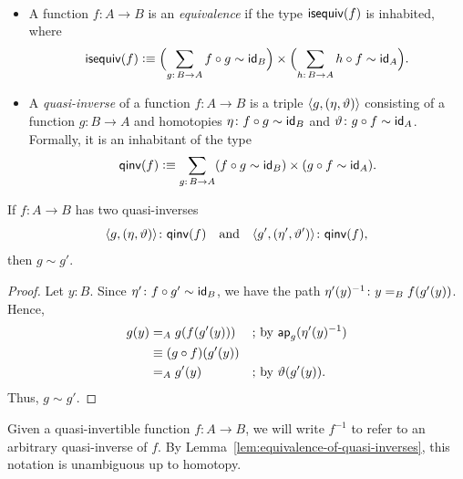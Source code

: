 \begin{defns}\label{defns:isequiv-qinv}${}$
    \begin{itemize}
        \item A function $f\colon A\to B$ is an \textsl{equivalence} if the type $\mathsf{isequiv}(f)$ is inhabited, where
        \[
            \fun{isequiv}(f)\defeq
                \Bigl(\sum_{g\colon B\to A}f\circ g \sim \id_B\Bigr)
                \times
                \Bigl(\sum_{h\colon B\to A}h\circ f\sim\id_A\Bigr).
        \]
    
        \item A \textsl{quasi-inverse} of a function $f \colon A \to B$ is a triple $\langle g,(\eta,\vartheta)\rangle$ consisting of a function $g\colon B\to A$ and homotopies $\eta\colon f\circ g\sim \id_B$ and $\vartheta\colon g\circ f\sim \id_A$. Formally, it is an inhabitant of the type
        \[
            \fun{qinv}(f)\defeq\sum_{g\colon B\to A}
                (f\circ g\sim\id_B)\times(g\circ f\sim\id_A).
        \]
    \end{itemize}
\end{defns}

\begin{lem}\label{lem:equivalence-of-quasi-inverses}
    If\/ $f\colon A\to B$ has two quasi-inverses
    \[
        \dep{g,(\eta,\vartheta)}\colon\fun{qinv}(f)
        \quad\text{and}\quad
        \dep{g',(\eta',\vartheta')}\colon\fun{qinv}(f),
    \]
    then\/ $g\sim g'$.
\end{lem}

\begin{proof}
    Let\/ $y\colon B$. Since\/ $\eta'\colon f\circ g'\sim\id_B$, we have the path\/ $\eta'(y)^{-1}\colon y\eq B f(g'(y))$. Hence,
    \begin{align*}
        g(y)&\mathrel{=_{A}} g(f(g'(y)))
                &&\text{; by }\mathsf{ap}_g(\eta'(y)^{-1})\\
            &\equiv (g\circ f)(g'(y))\\
             &\mathrel{=_{A}} g'(y)
                &&\text{; by }\vartheta(g'(y)).
    \end{align*}
    Thus, $g \sim g'$.
\end{proof}

\begin{ntn}\label{ntn:quasi-inverse}
    Given a quasi-invertible function\/ $f\colon A\to B$, we will write\/ $f^{-1}$ to refer to an arbitrary quasi-inverse of\/ $f$. By\/ {\upshape Lemma~\ref{lem:equivalence-of-quasi-inverses}}, this notation is unambiguous up to homotopy.
\end{ntn}

